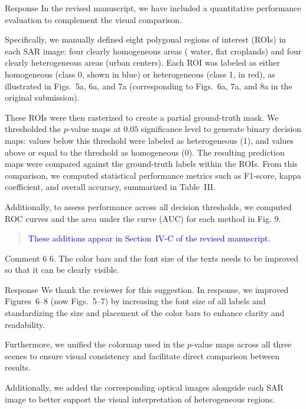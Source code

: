 \documentclass[11pt]{report}
\begin{document}
\begin{responsebox}{Response}
In the revised manuscript, we have included a quantitative performance evaluation to complement the visual comparison.

Specifically, we manually defined eight polygonal regions of interest (ROIs) in each SAR image: four clearly homogeneous areas ( water, flat croplands) and four clearly heterogeneous areas (urban centers). Each ROI was labeled as either homogeneous (class 0, shown in blue) or heterogeneous (class 1, in red),  as illustrated in Figs.~5a, 6a, and 7a (corresponding to Figs.~6a, 7a, and 8a in the original submission).

These ROIs were then rasterized to create a partial ground-truth mask. 
We thresholded the $p$-value maps at $0.05$ significance level to generate binary decision maps: values below this threshold were labeled as heterogeneous (1), and values above or equal to the threshold as homogeneous (0). 
The resulting prediction maps were compared against the ground-truth labels within the ROIs. 
From this comparison, we computed statistical performance metrics such as F1-score, kappa coefficient, and overall accuracy, summarized in Table~III.

Additionally, to assess performance across all decision thresholds, we computed ROC curves and the area under the curve (AUC) for each method in Fig. 9.

\begin{quote}
\textcolor{blue}{These additions appear in Section~IV-C of the revised manuscript.
}
\end{quote}
\end{responsebox}


\vspace{9em}


\begin{reviewbox}{Comment 6}
6. The color bars and the font size of the texts needs to be improved so that it can be clearly visible.
\end{reviewbox}

\begin{responsebox}{Response}
We thank the reviewer for this suggestion. In response, we improved Figures~6–8 (now Figs.~5–7) by increasing the font size of all labels and standardizing the size and placement of the color bars to enhance clarity and readability.

Furthermore, we unified the colormap used in the $p$-value maps across all three scenes to ensure visual consistency and facilitate direct comparison between results. 

Additionally, we added the corresponding optical images alongside each SAR image to better support the visual interpretation of heterogeneous regions.

\end{responsebox}
\end{document}
